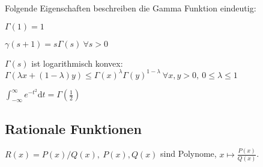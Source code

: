Folgende Eigenschaften beschreiben die Gamma Funktion eindeutig:
\begin{inparaenum}
    \item $\Gamma(1) = 1$
    \item $\gamma(s + 1) = s \Gamma(s) \ \forall s > 0$
    \item $\Gamma(s)$ ist logarithmisch konvex: $\Gamma(\lambda x + (1- \lambda)y) \le \Gamma(x)^\lambda \Gamma(y)^{1-\lambda} \ \forall x,y > 0, \ 0 \le \lambda \le 1$
\end{inparaenum}
\begin{compactitem}
    \item $\int_{-\infty}^{\infty} e^{-t^2}\mathrm{d}t = \Gamma(\frac{1}{2})$
\end{compactitem}

\subsection{Rationale Funktionen}
$R(x) = P(x) / Q(x), \ P(x), Q(x)$ sind Polynome, $x \mapsto \frac{P(x)}{Q(x)}$.
\begin{compactitem}
    \item
\end{compactitem}

